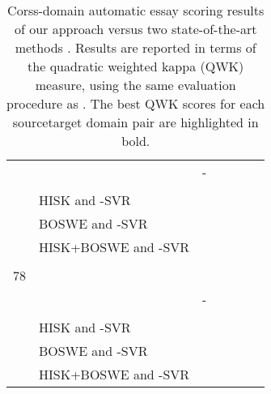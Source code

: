 \documentclass[11pt,a4paper]{article}
\begin{document}
\begin{table*}[!t]
\begin{center}
\begin{tabular}{clccccc}
											& \cite{Dong-EMNLP-2016}								& - 								&  				
																				&  					& 					& \\
\cline{2-7}
\vspace{-0.9em}\\

											& HISK and -SVR										&  					&  				
																				&  					& 					& \\

											& BOSWE and -SVR								&  					&  				
																				&  					& 					& \\

											& HISK+BOSWE and -SVR						&  	&  				
																				&  	& 	& \\
\hline
\vspace{-0.9em}\\
78					& \cite{Phandi-EMNLP-2015}							&  					&  				
																				&  					& 					& \\
																				
											& \cite{Dong-EMNLP-2016}								& - 								&  				
																				&  					& 					& \\
\cline{2-7}
\vspace{-0.9em}\\

											& HISK and -SVR										&  					&  				
																				&  					& 					& \\

											& BOSWE and -SVR								&  					&  				
																				&  					& 					& \\

											& HISK+BOSWE and -SVR						&  	&  				
																				&  	& 	& \\
\hline
\end{tabular}
\end{center}
\vspace*{-0.2cm}
\caption{Corss-domain automatic essay scoring results of our approach versus two state-of-the-art methods \cite{Phandi-EMNLP-2015,Dong-EMNLP-2016}. Results are reported in terms of the quadratic weighted kappa (QWK) measure, using the same evaluation procedure as \cite{Phandi-EMNLP-2015,Dong-EMNLP-2016}. The best QWK scores for each sourcetarget domain pair are highlighted in bold.}
\label{tab_AES_cross}
\vspace*{-0.3cm}
\end{table*}
\end{document}

